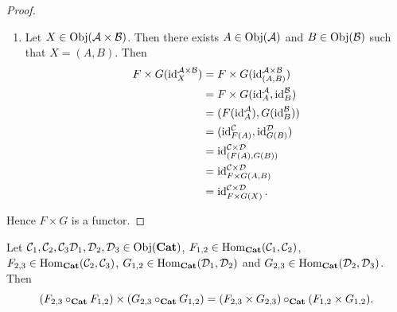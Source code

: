 \documentclass{book}
\begin{document}
\begin{proof}
\begin{enumerate}
\begin{align*}
				& = F \times G(f_{2,3}, g_{2,3}) \circ_{\MC \times \MD} F \times G(f_{1,2}, g_{1,2}) \\
				& = F \times G(h_{2,3}) \circ_{\MC \times \MD} F \times G(h_{1,2}).
			\end{align*}
			\item Let $X \in \Obj(\MA \times \MB)$. Then there exists $A \in \Obj(\MA)$ and $B \in \Obj(\MB)$ such that $X = (A, B)$. Then 
			\begin{align*}
				F \times G(\id_X^{\MA \times \MB})
				& = F \times G(\id_{(A,B)}^{\MA \times \MB}) \\
				& = F \times G(\id_A^{\MA}, \id_B^{\MB}) \\
				& = (F(\id_A^{\MA}), G(\id_B^{\MB})) \\
				& = (\id_{F(A)}^{\MC}, \id_{G(B)}^{\MD}) \\
				& = \id_{(F(A), G(B))}^{\MC \times \MD} \\
				& = \id_{F \times G(A,B)}^{\MC \times \MD} \\
				& = \id_{F \times G(X)}^{\MC \times \MD}.
			\end{align*}
		\end{enumerate}
		Hence $F \times G$ is a functor.
	\end{proof}
	
	\begin{ex} 
		 Let $\MC_1, \MC_2, \MC_3 \MD_1, \MD_2, \MD_3 \in \Obj(\bCat)$, $F_{1,2} \in \Hom_{\bCat}(\MC_1, \MC_2)$, $F_{2,3} \in \Hom_{\bCat}(\MC_2, \MC_3)$, $G_{1,2} \in \Hom_{\bCat}(\MD_1, \MD_2)$ and $G_{2,3} \in \Hom_{\bCat}(\MD_2, \MD_3)$. Then 
		 $$(F_{2,3} \circ_{\bCat} F_{1,2}) \times (G_{2,3} \circ_{\bCat} G_{1,2}) = (F_{2,3} \times G_{2,3}) \circ_{\bCat} (F_{1,2} \times G_{1,2}).$$
	\end{ex}
	
\end{document}
